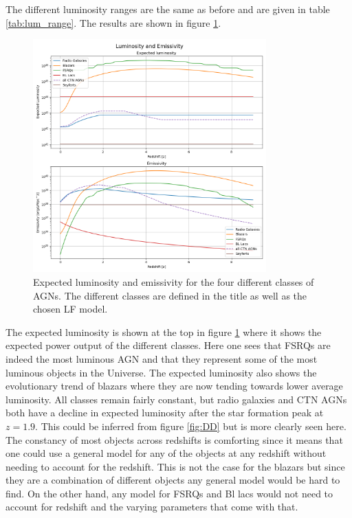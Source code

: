 \documentclass{article}
\begin{document}
The different luminosity ranges are the same as before and are given in table \ref{tab:lum_range}. The results are shown in figure \ref{fig:EL}.

\begin{figure}
    \centering
    \includegraphics[width = 0.8\textwidth]{new_plots/Luminosity and Emissivity.png}
    \caption{Expected luminosity and emissivity for the four different classes of AGNs. The different classes are defined in the title as well as the chosen LF model.}
    \label{fig:EL}
\end{figure}



The expected luminosity is shown at the top in figure \ref*{fig:EL} where it shows the expected power output of the different classes. Here one sees that FSRQs are indeed the most luminous AGN and 
that they represent some of the most luminous objects in the Universe.
The expected luminosity also shows the evolutionary trend of blazars where they are now tending towards lower average luminosity. 
All classes remain fairly constant, but radio galaxies and CTN AGNs both have a decline in expected luminosity after the star formation peak at $z=1.9$. This could be inferred from figure \ref*{fig:DD} but is more clearly seen here.
The constancy of most objects across redshifts is comforting since it means that one could use a general model for any of the objects at any redshift without needing to account for the redshift. 
This is not the case for the blazars but since they are a combination of different objects any general model would be hard to find. On the other hand, any model for FSRQs and Bl lacs would not need to account for redshift and the varying parameters that come with that. 
\end{document}
